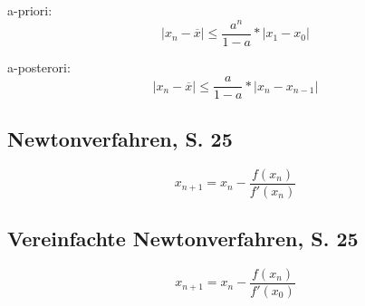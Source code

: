 a-priori:
\[|x_n - \overline{x}| \leq{} \frac{a^n}{1 - a} * |x_1 - x_0|\]

a-posterori:
\[|x_n - \overline{x}| \leq{} \frac{a}{1 - a} * |x_n - x_{n-1}|\]

\subsection{Newtonverfahren, S. 25}

\[x_{n+1} = x_n - \frac{f(x_n)}{f'(x_n)}\]

\subsection{Vereinfachte Newtonverfahren, S. 25}

\[x_{n+1} = x_n - \frac{f(x_n)}{f'(x_0)}\]

